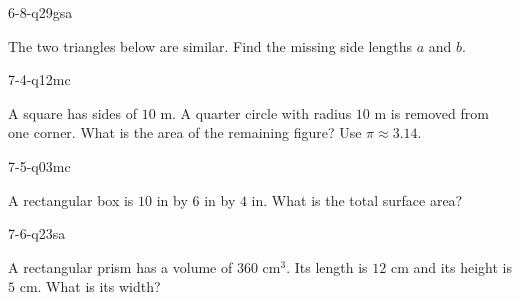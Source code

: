 \begin{practiceQuestion}{6-8-q29}{gsa}
\begin{questionText}
The two triangles below are similar. Find the missing side lengths $a$ and $b$.

\begin{center}
\end{center}
\end{questionText}
\end{practiceQuestion}

\begin{practiceQuestion}{7-4-q12}{mc}
\begin{questionText}
A square has sides of $10$ m. A quarter circle with radius $10$ m is removed from one corner. What is the area of the remaining figure? Use $\pi \approx 3.14$.
\end{questionText}
\end{practiceQuestion}

\begin{practiceQuestion}{7-5-q03}{mc}
\begin{questionText}
A rectangular box is $10$ in by $6$ in by $4$ in. What is the total surface area?
\end{questionText}
\end{practiceQuestion}

\begin{practiceQuestion}{7-6-q23}{sa}
\begin{questionText}
A rectangular prism has a volume of $360$ cm$^3$. Its length is $12$ cm and its height is $5$ cm. What is its width?
\end{questionText}
\end{practiceQuestion}

